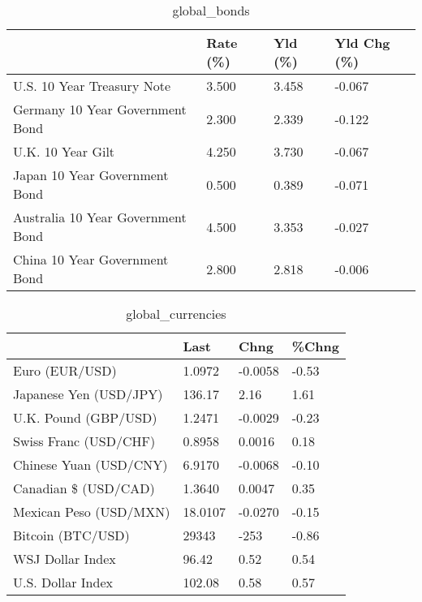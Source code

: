 \documentclass{article}%
\begin{document}
%


\begin{table}[htbp]%
\caption{global\_bonds}%
\centering%
\begin{adjustbox}{width=1\textwidth}%
\begin{tabular}{llll}
\toprule
                                  & Rate (\%) & Yld (\%) & Yld Chg (\%) \\
\midrule
       U.S. 10 Year Treasury Note &    3.500 &   3.458 &      -0.067 \\
  Germany 10 Year Government Bond &    2.300 &   2.339 &      -0.122 \\
                U.K. 10 Year Gilt &    4.250 &   3.730 &      -0.067 \\
    Japan 10 Year Government Bond &    0.500 &   0.389 &      -0.071 \\
Australia 10 Year Government Bond &    4.500 &   3.353 &      -0.027 \\
    China 10 Year Government Bond &    2.800 &   2.818 &      -0.006 \\
\bottomrule
\end{tabular}
%
\end{adjustbox}%
\end{table}

%


\begin{table}[htbp]%
\caption{global\_currencies}%
\centering%
\begin{adjustbox}{width=1\textwidth}%
\begin{tabular}{llll}
\toprule
                       &    Last &    Chng & \%Chng \\
\midrule
        Euro (EUR/USD) &  1.0972 & -0.0058 & -0.53 \\
Japanese Yen (USD/JPY) &  136.17 &    2.16 &  1.61 \\
  U.K. Pound (GBP/USD) &  1.2471 & -0.0029 & -0.23 \\
 Swiss Franc (USD/CHF) &  0.8958 &  0.0016 &  0.18 \\
Chinese Yuan (USD/CNY) &  6.9170 & -0.0068 & -0.10 \\
  Canadian \$ (USD/CAD) &  1.3640 &  0.0047 &  0.35 \\
Mexican Peso (USD/MXN) & 18.0107 & -0.0270 & -0.15 \\
     Bitcoin (BTC/USD) &   29343 &    -253 & -0.86 \\
      WSJ Dollar Index &   96.42 &    0.52 &  0.54 \\
     U.S. Dollar Index &  102.08 &    0.58 &  0.57 \\
\bottomrule
\end{tabular}
%
\end{adjustbox}%
\end{table}
\end{document}
